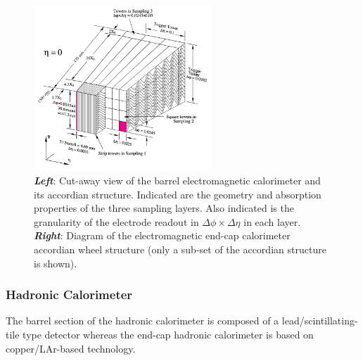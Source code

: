 \begin{figure}[!htb]
    \begin{center}
        \includegraphics[width=0.6\textwidth]{figures/chapter2/calorimeters/atlas_em_calo_barrel}
        \caption{
            \textbf{\textit{Left}}: Cut-away view of the barrel electromagnetic calorimeter and its accordian
                structure. Indicated are
                the geometry and absorption properties of the three sampling layers.
                Also indicated is the granularity of the electrode readout in $\Delta \phi \times \Delta \eta$
                in each layer.
            \textbf{\textit{Right}}: Diagram of the electromagnetic end-cap calorimeter accordian wheel structure
                (only a sub-set of the accordian structure is shown).
        }
        \label{fig:em_calo_section}
    \end{center}
\end{figure}

\FloatBarrier
\subsubsection{Hadronic Calorimeter}
\label{sec:calo_had}

The barrel section of the hadronic calorimeter is composed of a
lead/scintillating-tile type detector whereas the end-cap hadronic
calorimeter is based on copper/LAr-based technology.

